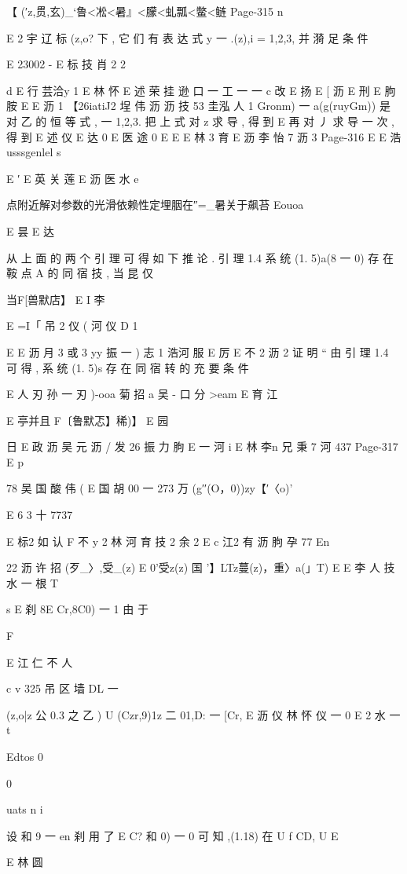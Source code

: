 {{{{{{{{{{{{{{{{{{【 {(′z,贯,玄)_`鲁<凇<暑』<朦<虬瓢<鳖<鲢}
Page-315
n

E
2 宇 辽
标 (z,o? 下 , 它 们 有 表 达 式 y 一 .(z),i = 1,2,3, 并 漪 足 条 件

E 23002 - E 标 技 肖 2
2

d
E 行 芸洽y 1
E 林
怀
E 述 荣 挂 逊 口 一 工 一 一
c
改
E 扬 E
[ 沥 E 刑
E 朐 胺
E
E 沥 1
【26iatiJ2 埕 伟 沥 沥 技 53 圭泓 人 1
Gronm) 一 a(g(ruyGm))
是 对 乙 的 恒 等 式 , 一 1,2,3. 把 上 式 对 z 求 导 , 得 到
E
再 对 丿 求 导 一 次 , 得 到
E 述 仪
E 达
0
E 医 途 0 E
E E 林 3 育
E 沥 李 怡 7 沥 3
Page-316
E E 浩 usssgenlel s

E ′
E 英 关 莲
E 沥 医 水 e

点附近解对参数的光滑依赖性定埋胭在″=_暑关于飙苔 Eouoa

E 昙
E 达

从 上 面 的 两 个 引 理 可 得 如 下 推 论 .
引 理 1.4 系 统 (1. 5)a(8 一 0) 存 在 鞍 点 A 的 同 宿 技 , 当 昆 仅

当F[兽默店】 E
I 李

E =I「 吊 2 仪 ( 河 仪
D 1

E
E 沥 月 3 或 3 yy 振 一 ) 志 1 浩河 服
E 厉
E 不 2 沥 2
证 明 “ 由 引 理 1.4 可 得 , 系 统 (1. 5)s 存 在 同 宿 转 的 充 要 条 件

E
人 刃 孙 一 刃 )-ooa 菊 招 a 吴 - 口 分 >eam
E 育 江

E 亭并且 F〔鲁默忑】稀)】 E 园

日 E 政 沥 吴 元 沥 / 发 26 振 力 朐
E 一 河
i
E 林 李n 兄 秉 7 河 437
Page-317
E p

78 吴 国 酸 伟 ( E 国 胡
00 一 273 万 (g′′(O，0))zy【′〈o)'

E 6 3 十 7737

E 标2 如 认 F
不 y 2 林 河 育 技 2 余 2
E c 江2 有 沥 朐 孕 77
En

22 沥 许 招 (歹_〉,受_(z) E 0'受z(z) 国 '】LTz蔓(z)，重〉a(」T) E
E 李 人 技 水 一 根
T

s
E 刹 8E Cr,8C0) 一 1 由 于

F

E 江 仁 不 人

c
v 325
吊 区 墙 DL 一 {(z,o|z 公 0.3 之 乙 ) U (Czr,9)1z 二 01,D: 一 [Cr,
E 沥 仪 林 怀 仪 一
0
E 2
水 一
t

Edtos 0

0

uats n i

设 和 9 一 en 刹 用 了 E C? 和 0) 一 0 可 知 ,(1.18) 在 U f CD, U
E

E 林 圆

}}}}}}}}}}}}}}}}}}}
